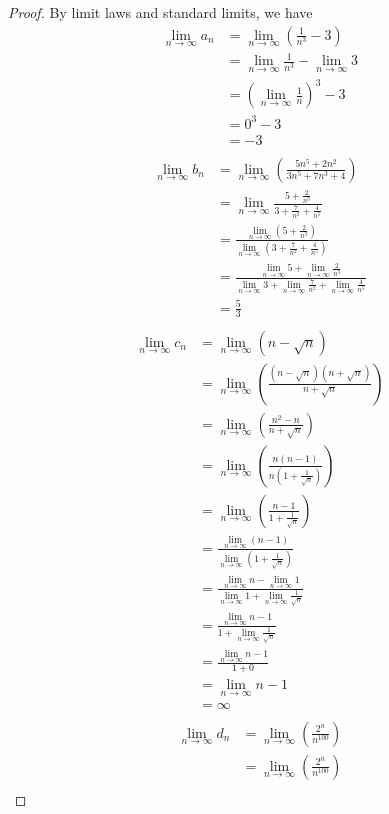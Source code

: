 \documentclass{article}
\newcommand{\limn}{\lim_{n\to\infty}}
\theoremstyle{mytheoremstyle}
\theoremstyle{mytheoremstyle}
\theoremstyle{myproblemstyle}
\begin{document}
    \begin{proof}
        By limit laws and standard limits, we have
        \begin{align*}
            \limn a_n &= \limn\left(\frac{1}{n^3} - 3\right) \\
                      &= \limn\frac{1}{n^3} - \limn 3 \\
                      &= \left(\limn\frac{1}{n}\right)^3 - 3 \\
                      &= 0^3 - 3 \\
                      &= -3 \\
        \end{align*}
        \begin{align*}
            \limn b_n &= \limn\left(\frac{5n^5 + 2n^2}{3n^5+7n^3+4}\right) \\
                      &= \limn\frac{5 + \frac{2}{n^3}}{3+\frac{7}{n^2}+\frac{4}{n^5}} \\
                      &= \frac{\limn(5 + \frac{2}{n^3})}{\limn(3+\frac{7}{n^2}+\frac{4}{n^5})} \\
                      &= \frac{\limn 5 + \limn\frac{2}{n^3}}{\limn 3+\limn\frac{7}{n^2}+\limn\frac{4}{n^5}} \\
                      &= \frac{5}{3} \\
        \end{align*}
        \begin{align*}
            \limn c_n &= \limn(n - \sqrt{n}) \\
                      &= \limn\left(\frac{(n - \sqrt{n})(n + \sqrt{n})}{n + \sqrt{n}}\right) \\
                      &= \limn\left(\frac{n^2 - n}{n + \sqrt{n}}\right) \\
                      &= \limn\left(\frac{n(n - 1)}{n(1 + \frac{1}{\sqrt{n}})}\right) \\
                      &= \limn\left(\frac{n - 1}{1 + \frac{1}{\sqrt{n}}}\right) \\
                        &= \frac{\limn(n - 1)}{\limn(1 + \frac{1}{\sqrt{n}})} \\
                        &= \frac{\limn n - \limn 1}{\limn 1 + \limn\frac{1}{\sqrt{n}}} \\
                        &= \frac{\limn n - 1}{1 + \limn\frac{1}{\sqrt{n}}} \\
                        &= \frac{\limn n - 1}{1 + 0} \\
                        &= \limn n - 1 \\
                        &= \infty \\
        \end{align*}
        \begin{align*}
            \limn d_n &= \limn(\frac{2^n}{n^100}) \\
                      &= \limn\left(\frac{2^n}{n^{100}}\right) \\
        \end{align*}
    \end{proof}
\end{document}
